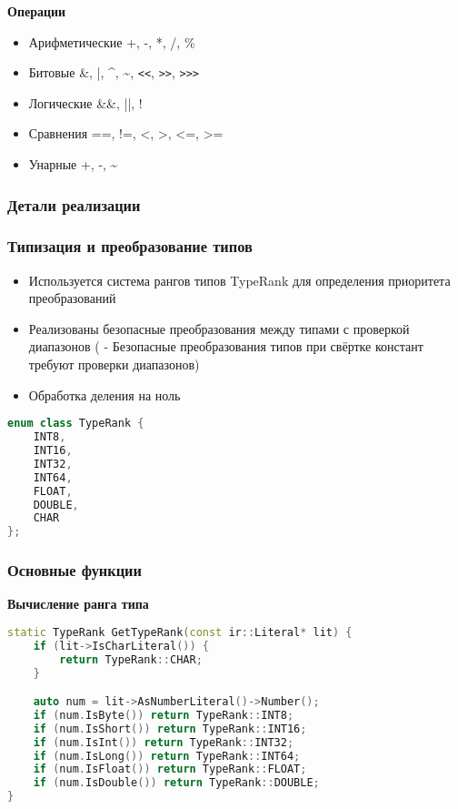 \textbf{Операции}
\begin{itemize}[label={--}]
    \item Арифметические  +, -, *, /, \%
    \item Битовые  \&, |, \^{}, \~{}, \verb|<<|, \verb|>>|, \verb|>>>|
    \item Логические  \&\&, ||, !
    \item Сравнения  ==, !=, <, >, <=, >=
    \item Унарные  +, -, \~{}
\end{itemize}

\subsubsection{Детали реализации}
\subsubsection*{Типизация и преобразование типов}
\begin{itemize}[label={--}]
    \item Используется система рангов типов TypeRank для определения приоритета преобразований
    \item Реализованы безопасные преобразования между типами с проверкой диапазонов (\cite{krasovsky2022} - Безопасные преобразования типов при свёртке констант требуют проверки диапазонов)
    \item Обработка деления на ноль
\end{itemize}

\begin{lstlisting}[language=C++,caption=Перечисление рангов типов]
enum class TypeRank {
    INT8,
    INT16,
    INT32,
    INT64,
    FLOAT,
    DOUBLE,
    CHAR
};
\end{lstlisting}

\subsubsection{Основные функции}
\textbf{Вычисление ранга типа}
\begin{lstlisting}[language=C++,caption=GetTypeRank]
static TypeRank GetTypeRank(const ir::Literal* lit) {
    if (lit->IsCharLiteral()) {
        return TypeRank::CHAR;
    }

    auto num = lit->AsNumberLiteral()->Number();
    if (num.IsByte()) return TypeRank::INT8;
    if (num.IsShort()) return TypeRank::INT16;
    if (num.IsInt()) return TypeRank::INT32;
    if (num.IsLong()) return TypeRank::INT64;
    if (num.IsFloat()) return TypeRank::FLOAT;
    if (num.IsDouble()) return TypeRank::DOUBLE;
}
\end{lstlisting}

